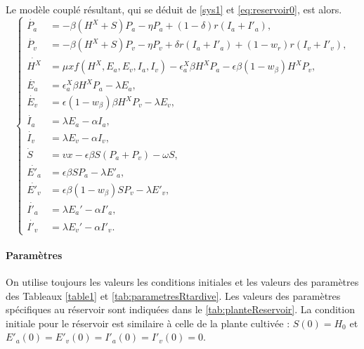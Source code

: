 Le modèle couplé résultant, qui se déduit de \eqref{sys1} et \eqref{eq:reservoir0}, est alors.
\begin{equation}
  \left\{
    \begin{aligned}
      \dot{P_a} &= - \beta (H^X + S) P_a - \eta P_a + (1-\delta) r (I_a + I'_a),\\
      \dot{P_v} &= - \beta (H^X + S) P_v - \eta P_v + \delta r (I_a + I'_a) + (1-w_{r}) r (I_v + I'_v),\\
      \dot{H^X} &= \mu x f(H^X,E_a,E_v,I_a,I_v) - \epsilon_a^X \beta  H^X P_a - \epsilon \beta (1-w_{\beta})  H^X P_v,\\
      \dot{E_a} &= \epsilon_a^X \beta H^X  P_a - \lambda E_a,\\
      \dot{E_v} &= \epsilon (1-w_{\beta}) \beta H^X P_v - \lambda E_v,\\
      \dot{I_a} &=  \lambda E_a  - \alpha I_a ,\\
      \dot{I_v} &= \lambda E_v - \alpha I_v,\\
      \dot{S} &= v x - \epsilon \beta S (P_a + P_v) - \omega S,\\
      \dot{E'_a} &= \epsilon \beta S P_a - \lambda E'_a,\\
      \dot{E'_v} &= \epsilon \beta (1-w_{\beta}) S P_v - \lambda E'_v,\\
      \dot{I'_a} &= \lambda E_a' - \alpha I'_a ,\\
      \dot{I'_v} &= \lambda E_v' - \alpha I'_v .
    \end{aligned}
  \right.
  \label{eq:reservoir-precoce}
\end{equation}

\paragraph{Paramètres}

On utilise toujours les valeurs les conditions initiales et les valeurs des paramètres des Tableaux \ref{table1} et \ref{tab:parametresRtardive}.
Les valeurs des paramètres spécifiques au réservoir sont indiquées dans le  \autoref{tab:planteReservoir}. La condition initiale pour le réservoir est similaire à celle de la plante cultivée : $S(0)=H_0$ et $E'_a(0)=E'_v(0)=I'_a(0)=I'_v(0)=0$.

